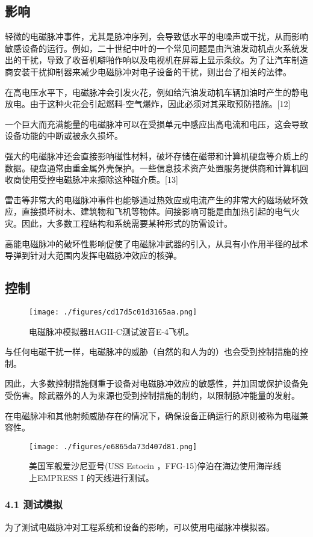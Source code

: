 \subsection{影响}
轻微的电磁脉冲事件，尤其是脉冲序列，会导致低水平的电噪声或干扰，从而影响敏感设备的运行。例如，二十世纪中叶的一个常见问题是由汽油发动机点火系统发出的干扰，导致了收音机噼啪作响以及电视机在屏幕上显示条纹。为了让汽车制造商安装干扰抑制器来减少电磁脉冲对电子设备的干扰，则出台了相关的法律。

在高电压水平下，电磁脉冲会引发火花，例如给汽油发动机车辆加油时产生的静电放电。由于这种火花会引起燃料-空气爆炸，因此必须对其采取预防措施。[12]

一个巨大而充满能量的电磁脉冲可以在受损单元中感应出高电流和电压，这会导致设备功能的中断或被永久损坏。

强大的电磁脉冲还会直接影响磁性材料，破坏存储在磁带和计算机硬盘等介质上的数据。硬盘通常由重金属外壳保护。一些信息技术资产处置服务提供商和计算机回收商使用受控电磁脉冲来擦除这种磁介质。[13]

雷击等非常大的电磁脉冲事件也能够通过热效应或电流产生的非常大的磁场破坏效应，直接损坏树木、建筑物和飞机等物体。间接影响可能是由加热引起的电气火灾。因此，大多数工程结构和系统需要某种形式的防雷设计。

高能电磁脉冲的破坏性影响促使了电磁脉冲武器的引入，从具有小作用半径的战术导弹到针对大范围内发挥电磁脉冲效应的核弹。

\subsection{控制}
\begin{figure}[ht]
\centering
\texttt{[image: ./figures/cd17d5c01d3165aa.png]}
\caption{电磁脉冲模拟器HAGII-C测试波音E-4飞机。} \label{fig_DCMC_2}
\end{figure}
与任何电磁干扰一样，电磁脉冲的威胁（自然的和人为的）也会受到控制措施的控制。

因此，大多数控制措施侧重于设备对电磁脉冲效应的敏感性，并加固或保护设备免受伤害。除武器外的人为来源也受到控制措施的制约，以限制脉冲能量的发射。

在电磁脉冲和其他射频威胁存在的情况下，确保设备正确运行的原则被称为电磁兼容性。
\begin{figure}[ht]
\centering
\texttt{[image: ./figures/e6865da73d407d81.png]}
\caption{美国军舰爱沙尼亚号(USS Estocin ，FFG-15)停泊在海边使用海岸线上EMPRESS I 的天线进行测试。} \label{fig_DCMC_3}
\end{figure}
\subsubsection{4.1 测试模拟}
为了测试电磁脉冲对工程系统和设备的影响，可以使用电磁脉冲模拟器。

